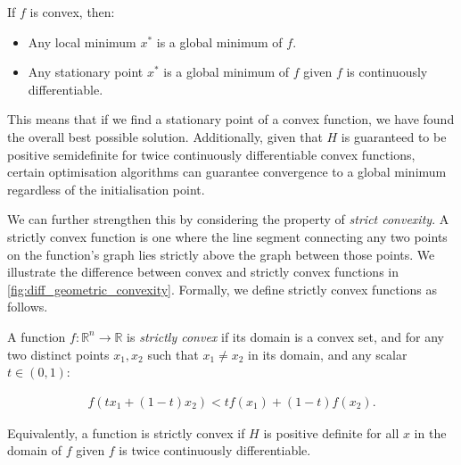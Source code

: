 \begin{definition}

    If $f$ is convex, then: 

    \begin{itemize}

        \item Any local minimum $x^*$ is a global minimum of $f$.

        \item Any stationary point $x^*$ is a global minimum of $f$ given $f$ is continuously differentiable.

    \end{itemize}

\end{definition}



This means that if we find a stationary point of a convex function, we have found the overall best possible solution. Additionally, given that $H$ is guaranteed to be positive semidefinite for twice continuously differentiable convex functions, certain optimisation algorithms can guarantee convergence to a global minimum regardless of the initialisation point. 



We can further strengthen this by considering the property of \textit{strict convexity}. A strictly convex function is one where the line segment connecting any two points on the function's graph lies strictly above the graph between those points. We illustrate the difference between convex and strictly convex functions in \cref{fig:diff_geometric_convexity}. Formally, we define strictly convex functions as follows.

\begin{definition}

    A function $f: \mathbb{R}^n \to \mathbb{R}$ is \textit{strictly convex} if its domain is a convex set, and for any two distinct points $x_1, x_2$ such that $x_1 \neq x_2$ in its domain, and any scalar $t \in (0, 1)$:

    \begin{align}

        f(t x_1 + (1-t)x_2) < t f(x_1) + (1-t)f(x_2).

    \end{align}

    Equivalently, a function is strictly convex if $H$ is positive definite for all $x$ in the domain of $f$ given $f$ is twice continuously differentiable.

\end{definition}



